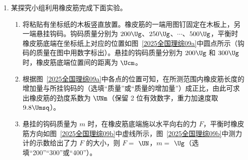\documentclass[\gkver]{gaokaozhenti}
\begin{document}
\begin{enumerate}

{OP 与虚线平行时圆环中感应电流最大}
{圆环中感应电流变化的周期与环转动周期相同}
{圆环在磁场内且 OP 与虚线垂直时环中感应电流最大}


\item
某探究小组利用橡皮筋完成下面实验。
\begin{enumerate}
	\item
	将粘贴有坐标纸的木板竖直放置。橡皮筋的一端用图钉固定在木板上，另一端悬挂钩码。钩码质量分别为 $200 \Ug$、$250 \Ug$、$\cdots$、$500 \Ug$，平衡时橡皮筋底端在坐标纸上对应的位置如图~\ref{2025全国理综09a}中圆点所示（钩码的质量在图中用数字标出）。悬挂的钩码质量分别为 $200 \Ug$ 和 $300 \Ug$ 时，橡皮筋底端位置间的距离为 $\Ucm$。
	\item
	根据图~\ref{2025全国理综09a}中各点的位置可知，在所测范围内橡皮筋长度的增加量与所挂钩码的（选填“质量”或“质量的增加量”）成正比，由此可求出橡皮筋的劲度系数为 $\UNm$（保留 2 位有效数字，重力加速度取 $9.8 \Umsq$）。
	\item
	悬挂的钩码质量为 $m$ 时，在橡皮筋底端施以水平向右的力 $F$，平衡时橡皮筋方向如图~\ref{2025全国理综09b}中虚线所示，图~\ref{2025全国理综09b}中测力计的示数给出了力 $F$ 的大小，则 $F = $ $\UN$，$m = $ $\Ug$（选填“200”“300”或“400”）。
\end{enumerate}


\end{enumerate}
\end{document}
